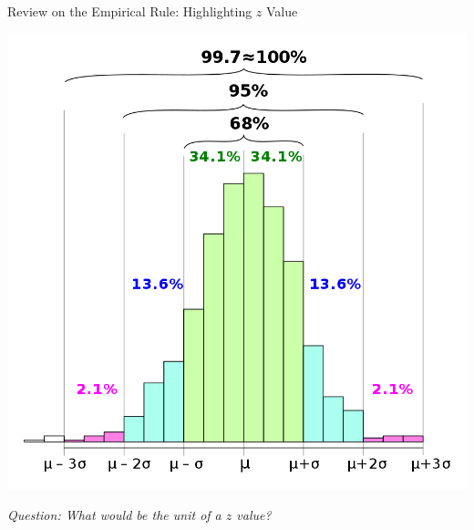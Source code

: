 \documentclass{beamer}
\begin{document}
\begin{frame}{Review on the Empirical Rule: Highlighting $z$ Value}
\begin{multicols}{2}
\includegraphics[scale=0.15]{images/ch2EmpiricalRule.png}

\end{multicols}

\begin{center}
\textit{Question: What would be the unit of a $z$ value? 
}
\end{center}
\end{frame}
\end{document}
